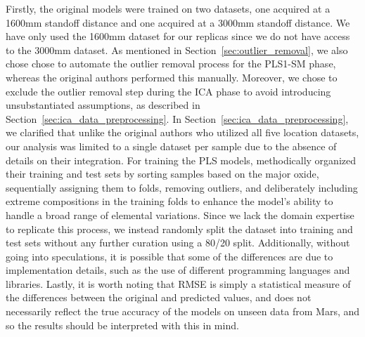 Firstly, the original models were trained on two datasets, one acquired at a 1600mm standoff distance and one acquired at a 3000mm standoff distance.
We have only used the 1600mm dataset for our replicas since we do not have access to the 3000mm dataset.
As mentioned in Section~\ref{sec:outlier_removal}, we also chose chose to automate the outlier removal process for the PLS1-SM phase, whereas the original authors performed this manually.
Moreover, we chose to exclude the outlier removal step during the ICA phase to avoid introducing unsubstantiated assumptions, as described in Section~\ref{sec:ica_data_preprocessing}.
In Section~\ref{sec:ica_data_preprocessing}, we clarified that unlike the original authors who utilized all five location datasets, our analysis was limited to a single dataset per sample due to the absence of details on their integration.
For training the PLS models, \citet{andersonImprovedAccuracyQuantitative2017} methodically organized their training and test sets by sorting samples based on the major oxide, sequentially assigning them to folds, removing outliers, and deliberately including extreme compositions in the training folds to enhance the model's ability to handle a broad range of elemental variations.
Since we lack the domain expertise to replicate this process, we instead randomly split the dataset into training and test sets without any further curation using a 80/20 split.
Additionally, without going into speculations, it is possible that some of the differences are due to implementation details, such as the use of different programming languages and libraries.
Lastly, it is worth noting that RMSE is simply a statistical measure of the differences between the original and predicted values, and does not necessarily reflect the true accuracy of the models on unseen data from Mars, and so the results should be interpreted with this in mind.

